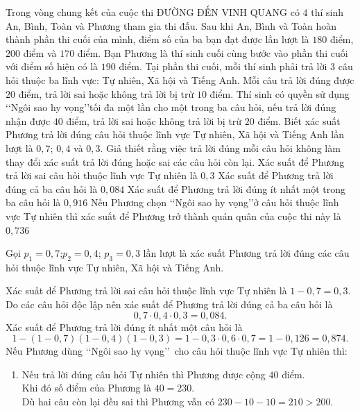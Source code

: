 \begin{ex}%
	Trong vòng chung kết của cuộc thi ĐƯỜNG ĐẾN VINH QUANG có $4$ thí sinh An, Bình, Toàn và Phương tham gia thi đấu. Sau khi An, Bình và Toàn hoàn thành phần thi cuối của mình, điểm số của ba bạn đạt được lần lượt là $180$ điểm, $200$ điểm và $170$ điểm. Bạn Phương là thí sinh cuối cùng bước vào phần thi cuối với điểm số hiện có là $190$ điểm. 
	Tại phần thi cuối, mỗi thí sinh phải trả lời $3$ câu hỏi thuộc ba lĩnh vực: Tự nhiên, Xã hội và Tiếng Anh. Mỗi câu trả lời đúng được $20$ điểm, trả lời sai hoặc không trả lời bị trừ $10$ điểm. Thí sinh có quyền sử dụng \lq\lq Ngôi sao hy vọng\rq\rq tối đa một lần cho một trong ba câu hỏi, nếu trả lời đúng nhận được $40$ điểm, trả lời sai hoặc không trả lời bị trừ $20$ điểm.
	Biết xác suất Phương trả lời đúng câu hỏi thuộc lĩnh vực Tự nhiên, Xã hội và Tiếng Anh lần lượt là $0{,}7$; $0{,}4$ và $0{,}3$. Giả thiết rằng việc trả lời đúng mỗi câu hỏi không làm thay đổi xác suất trả lời đúng hoặc sai các câu hỏi còn lại.
	\choiceTF
	{\True Xác suất để Phương trả lời sai câu hỏi thuộc lĩnh vực Tự nhiên là $0{,}3$}
	{\True Xác suất để Phương trả lời đúng cả ba câu hỏi là $0{,}084$}
	{Xác suất để Phương trả lời đúng ít nhất một trong ba câu hỏi là $0{,}916$}
	{\True Nếu Phương chọn \lq\lq Ngôi sao hy vọng\rq\rq ở câu hỏi thuộc lĩnh vực Tự nhiên thì xác suất để Phương trở thành quán quân của cuộc thi này là $0{,}736$}
	\loigiai
	{
	Gọi $p_1=0{,}7$;$p_2=0{,}4$; $p_3=0{,}3$ lần lượt là xác suất Phương trả lời đúng các câu hỏi thuộc lĩnh vực Tự nhiên, Xã hội và Tiếng Anh.
	\begin{itemchoice}
		\itemch 
		Xác suất để Phương trả lời sai câu hỏi thuộc lĩnh vực Tự nhiên là $1-0{,}7=0{,}3$.	
		\itemch 
		Do các câu hỏi độc lập nên xác suất để Phương trả lời đúng cả ba câu hỏi là 
		$$0{,}7\cdot 0{,}4\cdot 0{,}3 = 0{,}084.$$
		\itemch 
		Xác suất để Phương trả lời đúng ít nhất một câu hỏi là $$1-(1-0{,}7)(1-0{,}4)(1-0{,}3)=1-0{,}3\cdot 0{,}6\cdot 0{,}7=1-0{,}126=0{,}874.$$
		\itemch 
		Nếu Phương dùng \lq\lq Ngôi sao hy vọng\rq\rq \ cho câu hỏi thuộc lĩnh vực Tự nhiên thì:
		\begin{enumerate}[TH1.]
		\item Nếu trả lời đúng câu hỏi Tự nhiên thì Phương được cộng $40$ điểm.\\
			Khi đó số điểm của Phương là $40=230$.\\
			Dù hai câu còn lại đều sai thì Phương vẫn có $230-10-10=210>200$.\\

\end{enumerate}
\end{itemchoice}}
\end{ex}
